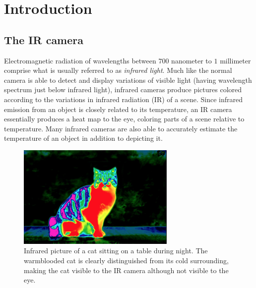 \section{Introduction}


\subsection{The IR camera}
Electromagnetic radiation of wavelengths between $700$ nanometer to $1$ millimeter comprise what is usually referred to as \textit{infrared light}. Much like the normal camera is able to detect and display variations of visible light (having wavelength spectrum just below infrared light), infrared cameras produce pictures colored according to the variations in infrared radiation  (IR) of a scene. Since infrared emission from an object is closely related to its temperature, an IR camera essentially produces a heat map to the eye, coloring parts of a scene relative to temperature. Many infrared cameras are also able to accurately estimate the temperature of an object in addition to depicting it.

\begin{figure}[h]
\begin{center}
\includegraphics[height=5cm]{gfx/cat.png}
\caption{Infrared picture of a cat sitting on a table during night. The warmblooded cat is clearly distinguished from its cold surrounding, making the cat visible to the IR camera although not visible to the eye.  }
\end{center}
\end{figure}

